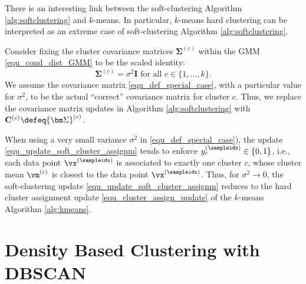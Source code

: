 \documentclass[12pt]{report}
\begin{document}
There is an interesting link between the soft-clustering 
Algorithm \ref{alg:softclustering} and $k$-means. In 
particular, $k$-means hard clustering can be interpreted 
as an extreme case of soft-clustering Algorithm \ref{alg:softclustering}. 

Consider fixing the cluster covariance matrices $ {\bm \Sigma}^{(c)}$ 
within the GMM \eqref{equ_cond_dist_GMM} to be the scaled identity: 
\begin{equation}
\label{equ_def_special_case}
 {\bm \Sigma}^{(c)}= \sigma^{2} \mathbf{I} \mbox{ for all } c \in \{1,\ldots,k\}.  
\end{equation} 
We assume the covariance matrix \eqref{equ_def_special_case}, 
with a particular value for $\sigma^{2}$, to be the actual ``correct'' 
covariance matrix for cluster $c$. %
Thus, we replace the covariance matrix updates in Algorithm \ref{alg:softclustering} 
with $\mathbf{C}^{(c)} \defeq  {\bm \Sigma}^{(c)}$.
 
When using a very small variance $\sigma^{2}$ in \eqref{equ_def_special_case}), 
the update \eqref{equ_update_soft_cluster_assignm} tends to enforce 
$y_{c}^{(\sampleidx)} \in \{0,1\}$, i.e., each data point $\vx^{(\sampleidx)}$ 
is associated to exactly one cluster $c$, whose cluster mean $\vm^{(c)}$ 
is closest to the data point $\vx^{(\sampleidx)}$. Thus, for $\sigma^{2} \rightarrow 0$, 
the soft-clustering update \eqref{equ_update_soft_cluster_assignm} reduces 
to the hard cluster assignment update \eqref{equ_cluster_assign_update} 
of the $k$-means Algorithm \ref{alg:kmeans}. 

\section{Density Based Clustering with DBSCAN}
\end{document}
